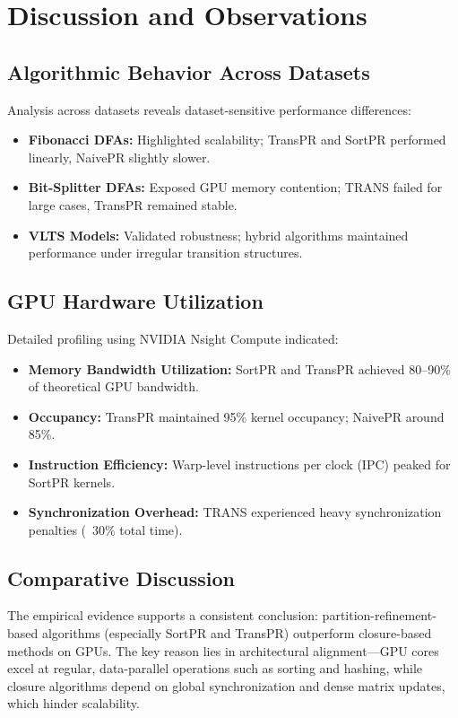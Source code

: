 \section{Discussion and Observations}

\subsection{Algorithmic Behavior Across Datasets}

Analysis across datasets reveals dataset-sensitive performance differences:
\begin{itemize}
    \item \textbf{Fibonacci DFAs:} Highlighted scalability; TransPR and SortPR performed linearly, NaivePR slightly slower.
    \item \textbf{Bit-Splitter DFAs:} Exposed GPU memory contention; TRANS failed for large cases, TransPR remained stable.
    \item \textbf{VLTS Models:} Validated robustness; hybrid algorithms maintained performance under irregular transition structures.
\end{itemize}

\subsection{GPU Hardware Utilization}

Detailed profiling using NVIDIA Nsight Compute indicated:
\begin{itemize}
    \item \textbf{Memory Bandwidth Utilization:} SortPR and TransPR achieved 80–90\% of theoretical GPU bandwidth.
    \item \textbf{Occupancy:} TransPR maintained 95\% kernel occupancy; NaivePR around 85\%.
    \item \textbf{Instruction Efficiency:} Warp-level instructions per clock (IPC) peaked for SortPR kernels.
    \item \textbf{Synchronization Overhead:} TRANS experienced heavy synchronization penalties (~30\% total time).
\end{itemize}

\subsection{Comparative Discussion}

The empirical evidence supports a consistent conclusion: partition-refinement-based algorithms (especially SortPR and TransPR) outperform closure-based methods on GPUs. The key reason lies in architectural alignment—GPU cores excel at regular, data-parallel operations such as sorting and hashing, while closure algorithms depend on global synchronization and dense matrix updates, which hinder scalability.

